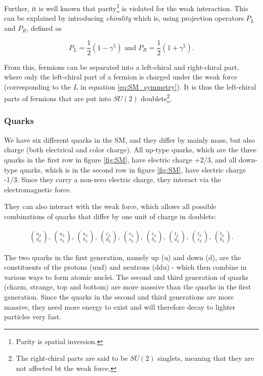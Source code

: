 Further, it is well known that parity\footnote{Parity is spatial inversion.} is violated for the weak interaction. This can be explained by introducing \textit{chirality} which is, using projection operators $P_L$ and $P_R$, defined as 

\begin{equation}
    \label{eq:chirality}
    P_L = \frac{1}{2}(1-\gamma^5) \text{  and  } P_R = \frac{1}{2}(1 + \gamma^5).
\end{equation}

From this, fermions can be separated into a left-chiral and right-chiral part, where only the left-chiral part of a fermion is charged under the weak force (corresponding to the $L$ in equation \ref{eq:SM_symmetry}). It is thus the left-chiral parts of fermions that are put into $SU(2)$ doublets\footnote{The right-chiral parts are said to be $SU(2)$ singlets, meaning that they are not affected bt the weak force.}.

\subsubsection{Quarks}
We have six different quarks in the SM, and they differ by mainly mass, but also charge (both electrical and color charge). All up-type quarks, which are the three quarks in the first row in figure \ref{fig:SM}, have electric charge +2/3, and all down-type quarks, which is in the second row in figure \ref{fig:SM}, have electric charge -1/3. Since they carry a non-zero electric charge, they interact via the electromagnetic force. 


They can also interact with the weak force, which allows all possible combinations of quarks that differ by one unit of charge in doublets: 

\begin{align}
    \binom{u_L}{d_L} \text{,  } \binom{u_L}{s_L} \text{,  } \binom{u_L}{b_L} \text{,  } \binom{c_L}{d_L} \text{,  } \binom{c_L}{s_L} \text{,  } \binom{c_L}{b_L} \text{,  } \binom{t_L}{d_L} \text{,  } \binom{t_L}{s_L} \text{,  } \binom{t_L}{b_L}.
\end{align}

The two quarks in the first generation, namely up (u) and down (d), are the constituents of the protons (uud) and neutrons (ddu) - which then combine in various ways to form atomic nuclei. The second and third generation of quarks (charm, strange, top and bottom) are more massive than the quarks in the first generation. Since the quarks in the second and third generations are more massive, they need more energy to exist and will therefore decay to lighter particles very fast. 


